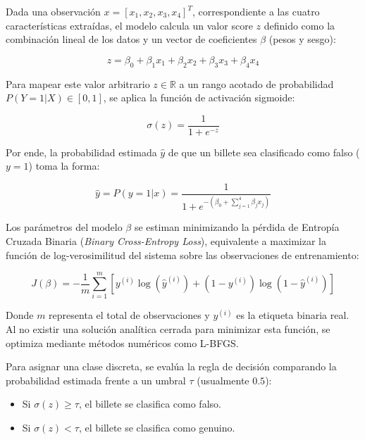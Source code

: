 \documentclass[conference]{IEEEtran}
\begin{document}
	Dada una observación $x = [x_1, x_2, x_3, x_4]^T$, correspondiente a las cuatro características extraídas, el modelo calcula un valor score $z$ definido como la combinación lineal de los datos y un vector de coeficientes $\beta$ (pesos y sesgo):
	
	\begin{equation}
		z = \beta_0 + \beta_1 x_1 + \beta_2 x_2 + \beta_3 x_3 + \beta_4 x_4
	\end{equation}
	
	Para mapear este valor arbitrario $z \in \mathbb{R}$ a un rango acotado de probabilidad $P(Y=1 | X) \in [0, 1]$, se aplica la función de activación sigmoide:
	
	\begin{equation}
		\sigma(z) = \frac{1}{1 + e^{-z}}
	\end{equation}
	
	Por ende, la probabilidad estimada $\hat{y}$ de que un billete sea clasificado como falso ($y=1$) toma la forma:
	
	\begin{equation}
		\hat{y} = P(y=1 | x) = \frac{1}{1 + e^{-(\beta_0 + \sum_{j=1}^{4} \beta_j x_j)}}
	\end{equation}
	
	Los parámetros del modelo $\beta$ se estiman minimizando la pérdida de Entropía Cruzada Binaria (\textit{Binary Cross-Entropy Loss}), equivalente a maximizar la función de log-verosimilitud del sistema sobre las observaciones de entrenamiento:
	
	\begin{equation}
		J(\beta) = -\frac{1}{m} \sum_{i=1}^{m} \left[ y^{(i)} \log(\hat{y}^{(i)}) + (1 - y^{(i)}) \log(1 - \hat{y}^{(i)}) \right]
	\end{equation}
	
	Donde $m$ representa el total de observaciones y $y^{(i)}$ es la etiqueta binaria real. Al no existir una solución analítica cerrada para minimizar esta función, se optimiza mediante métodos numéricos como L-BFGS\cite{aws_logistic_regression}.
	
	Para asignar una clase discreta, se evalúa la regla de decisión comparando la probabilidad estimada frente a un umbral $\tau$ (usualmente $0.5$):
	\begin{itemize}
		\item Si $\sigma(z) \ge \tau$, el billete se clasifica como falso.
		\item Si $\sigma(z) < \tau$, el billete se clasifica como genuino.
	\end{itemize}
	
\end{document}
